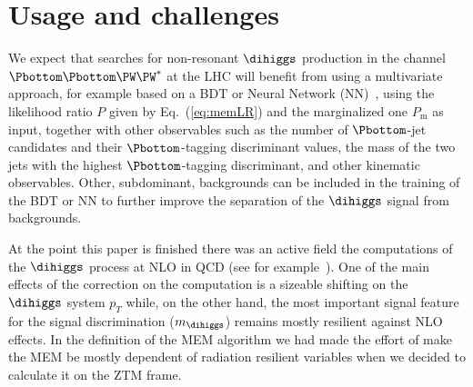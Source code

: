 \section{Usage and challenges}

We expect that searches for non-resonant $\dihiggs$ production in the channel $\Pbottom\Pbottom\PW\PW^{*}$ at the LHC
will benefit from using a multivariate approach, for example based on a BDT or Neural Network (NN)~\cite{TensorFlow,Keras},
using the likelihood ratio $P$ given by Eq.~(\ref{eq:memLR}) and the marginalized one $P_{\textrm{m}}$ as input,
together with other observables such as the number of $\Pbottom$-jet candidates and their $\Pbottom$-tagging discriminant values, 
the mass of the two jets with the highest $\Pbottom$-tagging discriminant, and other kinematic observables.
Other, subdominant, backgrounds can be included in the training of the BDT or NN
to further improve the separation of the $\dihiggs$ signal from backgrounds.

At the point this paper is finished there was an active field the computations of the $\dihiggs$ process at NLO in QCD (see for example~\cite{deFlorian:2013jea, Borowka:2016ehy, Heinrich:2017kxx}). 
One of the main effects of the correction on the computation is a sizeable shifting on the $\dihiggs$ system $p_T$ while,  on the other hand,
the most important signal feature for the signal discrimination ($m_{\dihiggs}$)  remains mostly resilient against NLO effects. 
In the definition of the MEM algorithm we had made the effort of make the MEM be mostly dependent of radiation resilient variables when we decided to calculate it on the ZTM frame. 

